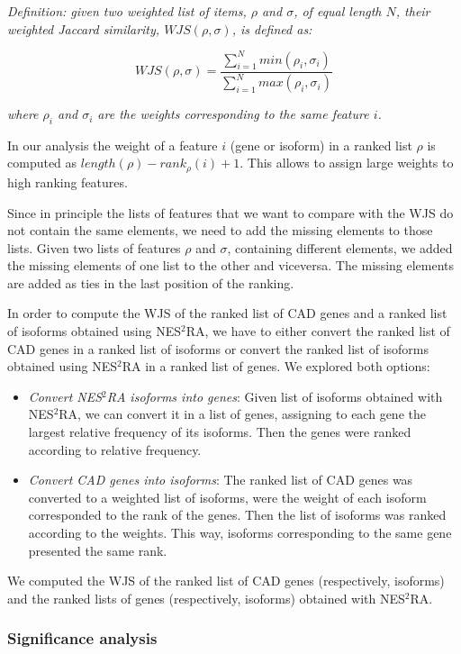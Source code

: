 \documentclass[fleqn,10pt]{SelfArx} %
\begin{document}
\noindent
\textit{Definition: given two weighted list of items, $\rho$ and $\sigma$, of equal length $N$, their weighted Jaccard similarity, $WJS(\rho, \sigma)$, is defined as:}

$$
WJS(\rho, \sigma) = \dfrac{\sum_{i=1}^Nmin(\rho_i,\sigma_i)}{\sum_{i=1}^Nmax(\rho_i,\sigma_i)}
$$

\noindent
\textit{where $\rho_i$ and $\sigma_i$ are the weights corresponding to the same feature $i$.}\medskip

In our analysis the weight of a feature $i$ (gene or isoform) in a ranked list $\rho$ is computed as $length(\rho) - rank_{\rho}(i) + 1$. This allows to assign large weights to high ranking features.

Since in principle the lists of features that we want to compare with the WJS do not contain the same elements, we need to add the missing elements to those lists. Given two lists of features $\rho$ and $\sigma$, containing different elements, we added the missing elements of one list to the other and viceversa. The missing elements are added as ties in the last position of the ranking.

In order to compute the WJS of the ranked list of CAD genes and a ranked list of isoforms obtained using NES$^2$RA, we have to either convert the ranked list of CAD genes in a ranked list of isoforms or convert the ranked list of isoforms obtained using NES$^2$RA in a ranked list of genes. We explored both options:

\begin{itemize}
	\item \textit{Convert NES$^2$RA isoforms into genes}: Given list of isoforms obtained with NES$^2$RA, we can convert it in a list of genes, assigning to each gene the largest relative frequency of its isoforms. Then the genes were ranked according to relative frequency.
	\item \textit{Convert CAD genes into isoforms}: The ranked list of CAD genes was converted to a weighted list of isoforms, were the weight of each isoform corresponded to the rank of the genes. Then the list of isoforms was ranked according to the weights. This way, isoforms corresponding to the same gene presented the same rank.
\end{itemize}

We computed the WJS of the ranked list of CAD genes (respectively, isoforms) and the ranked lists of genes (respectively, isoforms) obtained with NES$^2$RA.

\subsubsection{Significance analysis} 
\end{document}
